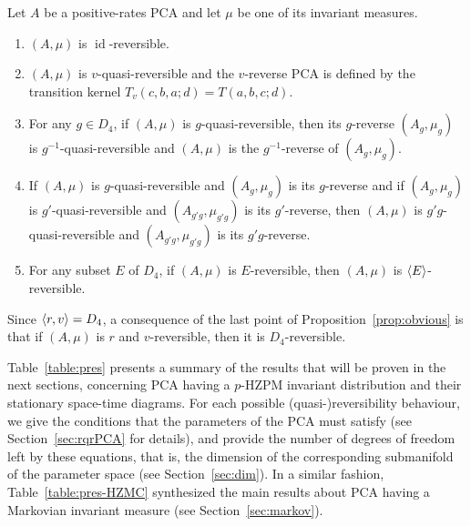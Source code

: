 \documentclass[AHL,Unicode,longabstracts]{cedram}
\DeclarePairedDelimiter{\vect}{\langle}{\rangle}
\newcounter{a}
\DeclareMathOperator{\id}{id}
\begin{document}
\begin{prop}\label{prop:obvious}
Let $A$ be a positive-rates PCA and let $\mu$ be one of its invariant measures.
\begin{enumerate}
\item \label{list2.7.1}$(A,\mu)$ is $\id$-reversible.
\item \label{list2.7.2}$(A,\mu)$ is $v$-quasi-reversible and the $v$-reverse PCA is defined by the transition kernel $T_v(c,b,a;d) = T(a,b,c;d)$.
\item \label{list2.7.3}For any $g \in D_4$, if $(A,\mu)$ is $g$-quasi-reversible, then its $g$-reverse $(A_g,\mu_g)$ is $g^{-1}$-quasi-reversible and $(A,\mu)$ is the $g^{-1}$-reverse of $(A_g,\mu_g)$.
\item \label{list2.7.4}If $(A,\mu)$ is $g$-quasi-reversible and $(A_g,\mu_g)$ is its $g$-reverse and if $(A_g,\mu_g)$ is $g'$-quasi-reversible and $(A_{g'g},\mu_{g'g})$ is its $g'$-reverse, then $(A,\mu)$ is $g' g$-quasi-reversible and $(A_{g'g},\mu_{g'g})$ is its $g' g$-reverse.
\item \label{list2.7.5}For any subset $E$ of $D_4$, if $(A,\mu)$ is $E$-reversible, then $(A,\mu)$ is $\vect{E}$-reversible.
\end{enumerate}
\end{prop}

\begin{rema}
Since $\vect{r,v}=D_4$, a consequence of the last point of Proposition~\ref{prop:obvious} is that if $(A,\mu)$ is $r$ and $v$-reversible, then it is $D_4$-reversible.
\end{rema}

Table~\ref{table:pres} presents a summary of the results that will be proven in the next sections, concerning PCA having a $p$-HZPM invariant distribution and their stationary space-time diagrams. For each possible (quasi-)reversibility behaviour, we give the conditions that the parameters of the PCA must satisfy (see Section~\ref{sec:rqrPCA} for details), and provide the number of degrees of freedom left by these equations, that is, the dimension of the corresponding submanifold of the parameter space (see Section~\ref{sec:dim}). In a similar fashion, Table~\ref{table:pres-HZMC} synthesized the main results about PCA having a Markovian invariant measure (see Section~\ref{sec:markov}).
\end{document}
